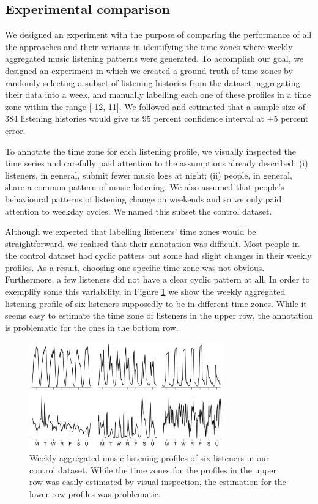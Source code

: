\subsection{Experimental comparison}
We designed an experiment with the purpose of comparing the performance of all the approaches and their variants in identifying the time zones where weekly aggregated music listening patterns were generated.
To accomplish our goal, we designed an experiment in which we created a ground truth of time zones by randomly selecting a subset of listening histories from the dataset, aggregating their data into a week, and manually labelling each one of these profiles in a time zone within the range [-12, 11]. We followed \textcite{cochran77sampling} and estimated that a sample size of 384 listening histories would give us 95 percent confidence interval at $\pm$5 percent error.

To annotate the time zone for each listening profile, we visually inspected the time series and carefully paid attention to the assumptions already described: (i) listeners, in general, submit fewer music logs at night; (ii) people, in general, share a common pattern of music listening. We also assumed that people's behavioural patterns of listening change on weekends and so we only paid attention to weekday cycles. We named this subset the control dataset. 

Although we expected that labelling listeners' time zones would be straightforward, we realised that their annotation was difficult. Most people in the control dataset had cyclic patters but some had slight changes in their weekly profiles. As a result, choosing one specific time zone was not obvious. Furthermore, a few listeners did not have a clear cyclic pattern at all. 
In order to exemplify some this variability, in Figure \ref{fig:tz_eight_users} we show the weekly aggregated listening profile of six listeners supposedly to be in different time zones. While it seems easy to estimate the time zone of listeners in the upper row, the annotation is problematic for the ones in the bottom row. 

\begin{figure}[!h]
\vspace{1em}
\centering
\includegraphics[width = 0.75\textwidth]{8_aggregated_weekly_behaviour.pdf}
\caption[Example of weekly aggregated music listening profiles of six listeners]{Weekly aggregated music listening profiles of six listeners in our control dataset. While the time zones for the profiles in the upper row was easily estimated by visual inspection, the estimation for the lower row profiles was problematic.}
\label{fig:tz_eight_users}
\end{figure}


